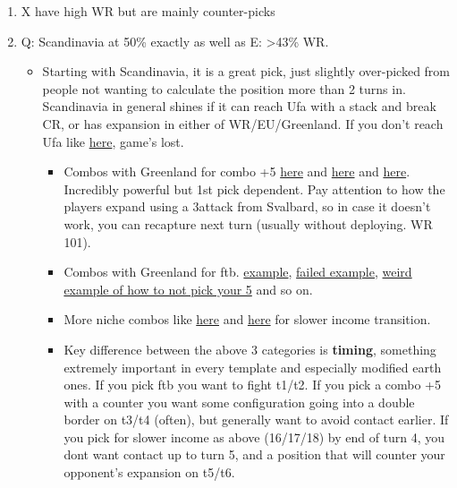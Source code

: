 \begin{enumerate}
\begin{itemize}
        \item Africa is conflicted. Can be really god. Can be god awful.
    \end{itemize}
    \item X have high WR but are mainly counter-picks
    \item Q: Scandinavia at 50\% exactly as well as E: >43\% WR. 
    \begin{itemize}
        \item Starting with Scandinavia, it is a great pick, just slightly over-picked from people not wanting to calculate the position more than 2 turns in. Scandinavia in general shines if it can reach Ufa with a stack and break CR, or has expansion in either of WR/EU/Greenland. If you don't reach Ufa like \href{https://www.warzone.com/MultiPlayer?GameID=34547862}{here}, game's lost.
        \begin{itemize}
            \item Combos with Greenland for combo +5 \href{https://www.warzone.com/MultiPlayer?GameID=38946241}{here} and \href{https://www.warzone.com/MultiPlayer?GameID=40572104}{here} and \href{https://www.warzone.com/MultiPlayer?GameID=34052341}{here}. Incredibly powerful but 1st pick dependent. Pay attention to how the players expand using a 3attack from Svalbard, so in case it doesn't work, you can recapture next turn (usually without deploying. WR 101).
            \item Combos with Greenland for ftb. \href{https://www.warzone.com/MultiPlayer?GameID=37573271}{example}, \href{https://www.warzone.com/MultiPlayer?GameID=33048983}{failed example}, \href{https://www.warzone.com/MultiPlayer?GameID=32584403}{weird example of how to not pick your 5} and so on.
            \item More niche combos like \href{https://www.warzone.com/MultiPlayer?GameID=33613524}{here} and \href{https://www.warzone.com/MultiPlayer?GameID=29179449}{here} for slower income transition. 
            \item Key difference between the above 3 categories is \textbf{timing}, something extremely important in every template and especially modified earth ones. If you pick ftb you want to fight t1/t2. If you pick a combo +5 with a counter you want some configuration going into a double border on t3/t4 (often), but generally want to avoid contact earlier. If you pick for slower income as above (16/17/18) by end of turn 4, you dont want contact up to turn 5, and a position that will counter your opponent's expansion on t5/t6. 

\end{itemize}
\end{itemize}
\end{enumerate}
